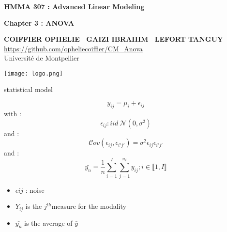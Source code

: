 \documentclass[unknownkeysallowed]{beamer}
\begin{document}



\begin{frame}
\bigskip
\bigskip
\begin{center}{
\LARGE\color{marron}
\textbf{HMMA 307 : Advanced Linear Modeling}
\textbf{ }\\
\vspace{0.5cm}
}

\color{marron}
\textbf{Chapter 3 : ANOVA}
\end{center}

\vspace{0.5cm}

\begin{center}
\textbf{COIFFIER OPHELIE \ GAIZI IBRAHIM \ LEFORT TANGUY } \\
\vspace{0.1cm}
\url{https://github.com/opheliecoiffier/CM_Anova}\\
\vspace{0.5cm}
Université de Montpellier \\
\end{center}

\centering
\texttt{[image: logo.png]}

\end{frame}
\begin{frame}
\begin{alertblock}{statistical model}

$$
y_{ij}=\mu_i+\epsilon_{ij}
$$
with : $$ \epsilon_{ij} : iid ~\mathcal{N}(0,\sigma^2) $$
and : $$\mathcal{C}ov(\epsilon_{ij},\epsilon_{i'j'})=\sigma^2 \epsilon_{ij} \epsilon_{i'j'} $$
and : $$\bar{y_n}= \frac{1}{n} \sum\limits_{i=1}^I \sum\limits_{j=1}^{n_i}y_{ij} ; i\in \llbracket 1,I \rrbracket $$
 \begin{itemize}
        \item $\epsilon{ij}$ : noise
        \item $Y_{ij}$ is the $j^{th}$measure for the modality
        \item $\bar{y_n}$ is the average of $\bar{y}$
    \end{itemize}
\end{alertblock}
\vspace{0.4cm}
\end{frame}
\end{document}
